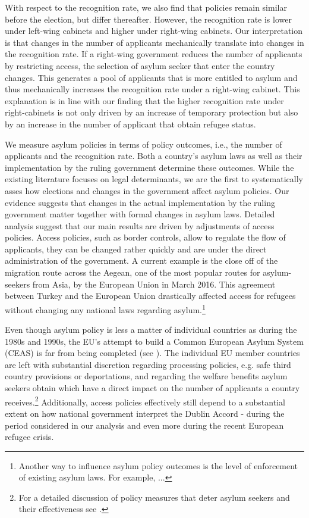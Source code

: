 \documentclass[a4paper,12pt]{article}
\begin{document}
With respect to the recognition rate, we also find that policies remain similar before the election, but differ thereafter. However, the recognition rate is lower under left-wing cabinets and higher under right-wing cabinets. Our interpretation is that changes in the number of applicants mechanically translate into changes in the recognition rate. If a right-wing government reduces the number of applicants by restricting access, the selection of asylum seeker that enter the country changes. This generates a pool of applicants that is more entitled to asylum and thus mechanically increases the recognition rate under a right-wing cabinet. This explanation is in line with our finding that the higher recognition rate under right-cabinets is not only driven by an increase of temporary protection but also by an increase in the number of applicant that obtain refugee status. 

We measure asylum policies in terms of policy outcomes, i.e., the number of applicants and the recognition rate. Both a country's asylum laws as well as their implementation by the ruling government determine these outcomes. While the existing literature focuses on legal determinants, we are the first to systematically asses how elections and changes in the government affect asylum policies. Our evidence suggests that changes in the actual implementation by the ruling government matter together with formal changes in asylum laws. Detailed analysis suggest that our main results are driven by adjustments of access policies. Access policies, such as border controls, allow to regulate the flow of applicants, they can be changed rather quickly and are under the direct administration of the government. A current example is the close off of the migration route across the Aegean, one of the most popular routes for asylum-seekers from Asia, by the European Union in March 2016. This agreement between Turkey and the European Union drastically affected access for refugees without changing any national laws regarding asylum.\footnote{Another way to influence asylum policy outcomes is the level of enforcement of existing asylum laws. For example, ...} 

Even though asylum policy is less a matter of individual countries as during the 1980s and 1990s, the EU's attempt to build a Common European Asylum System (CEAS) is far from being completed (see \citet{hatton2015EU}). The individual EU member countries are left with substantial discretion regarding processing policies, e.g. safe third country provisions or deportations, and regarding the welfare benefits asylum seekers obtain which have a direct impact on the number of applicants a country receives.\footnote{For a detailed discussion of policy measures that deter asylum seekers and their effectiveness see \citet{thielemann2006}.} Additionally, access policies effectively still depend to a substantial extent on how national government interpret the Dublin Accord - during the period considered in our analysis and even more during the recent European refugee crisis.
\end{document}
